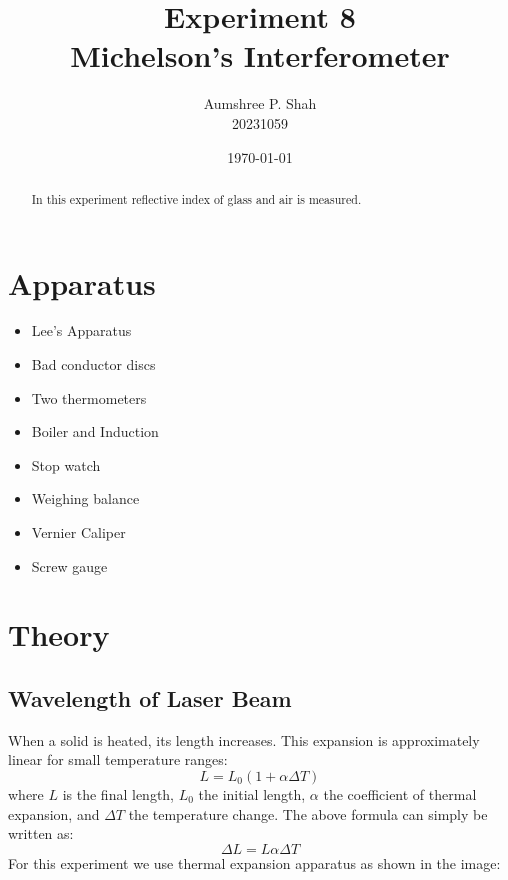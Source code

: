 \documentclass[%
 sor,
 jor,
 amsmath,amssymb,
 reprint,
]{revtex4-2}
\begin{document}
\title{Experiment 8\\Michelson's Interferometer}

\author{Aumshree P. Shah\\20231059}
\date{\today}

\begin{abstract}
\centering
In this experiment reflective index of glass and air is measured. 
\end{abstract}

\maketitle

\section{Apparatus}
\small
\begin{minipage}{0.48\textwidth}
\begin{itemize}
\item Lee’s Apparatus \item Bad conductor discs \item Two thermometers \item Boiler and Induction 
\end{itemize}
\end{minipage}
\begin{minipage}{0.48\textwidth}
\begin{itemize}
	\item Stop watch \item Weighing balance \item Vernier Caliper \item Screw gauge
\end{itemize}
\end{minipage}
\section{Theory}
\subsection{Wavelength of Laser Beam}







When a solid is heated, its length increases. This expansion is approximately linear for small temperature ranges:
\begin{equation}
L = L_0 (1 + \alpha \Delta T)
\end{equation}
where $L$ is the final length, $L_0$ the initial length, $\alpha$ the coefficient of thermal expansion, and $\Delta T$ the temperature change.
The above formula can simply be written as: $$\Delta L = L \alpha \Delta T $$ For this experiment we use thermal expansion apparatus as shown in the image:\\
\end{document}
